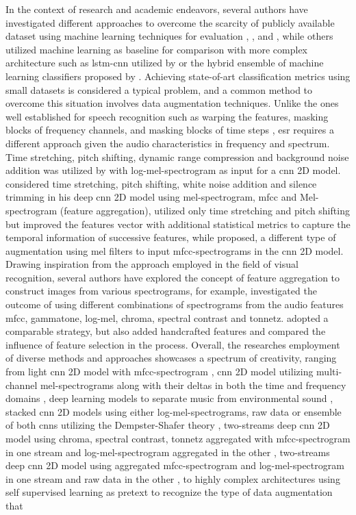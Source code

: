 In the context of research and academic endeavors, several authors have investigated different approaches to overcome the scarcity of publicly available dataset using machine learning techniques for evaluation  \cite{Salamon2014}, \cite{Bountourakis2015}, and \cite{Piczak2015}, while others utilized machine learning as baseline for comparison with more complex architecture such as \gls{lstm}-\gls{cnn} utilized by \textcite{Pandya2021} or the hybrid ensemble of machine learning classifiers proposed by \textcite{Bansal2022}. Achieving state-of-art classification metrics using small datasets is considered a typical problem, and a common method to overcome this situation involves data augmentation techniques. Unlike the ones well established for speech recognition such as warping the features, masking blocks of frequency channels, and masking blocks of time steps \cite{Park2019}, \gls{esr} requires a different approach given the audio characteristics in frequency and spectrum. Time stretching, pitch shifting, dynamic range compression and background noise addition was utilized by \textcite{Salamon2017} with log-mel-spectrogram as input for a \gls{cnn} 2D model. \textcite{Mushtaq2020} considered time stretching, pitch shifting, white noise addition and silence trimming in his deep \gls{cnn} 2D model using mel-spectrogram, \gls{mfcc} and Mel-spectrogram (feature aggregation), \textcite{Bountourakis2019} utilized only time stretching and pitch shifting but improved the features vector with additional statistical metrics to capture the temporal information of successive features, while \textcite{Chu2023} proposed, a different type of augmentation using mel filters to input \gls{mfcc}-spectrograms in the \gls{cnn} 2D model. Drawing inspiration from the approach employed in the field of visual recognition, several authors have explored the concept of feature aggregation to construct images from various spectrograms, for example, \textcite{Su2020} investigated the outcome of using different combinations of spectrograms from the audio features \gls{mfcc}, gammatone, log-mel, chroma, spectral contrast and tonnetz. \textcite{Luz2021} adopted a comparable strategy, but also added handcrafted features and compared the influence of feature selection in the process. Overall, the researches employment of diverse methods and approaches showcases a spectrum of creativity, ranging from light \gls{cnn} 2D model with \gls{mfcc}-spectrogram \cite{Shreyas2020}, \gls{cnn} 2D model utilizing multi-channel mel-spectrograms along with their deltas in both the time and frequency domains \cite{Tang2018}, deep learning models to separate music from environmental sound \cite{Rothmund2018}, stacked \gls{cnn} 2D models using either log-mel-spectrograms, raw data or ensemble of both \gls{cnn}s utilizing the Dempster-Shafer theory \cite{Li2018}, two-streams deep \gls{cnn} 2D model using chroma, spectral contrast, tonnetz aggregated with \gls{mfcc}-spectrogram in one stream and log-mel-spectrogram aggregated in the other \cite{Su2019}, two-streams deep \gls{cnn} 2D model using aggregated \gls{mfcc}-spectrogram and log-mel-spectrogram in one stream and raw data in the other \cite{Tran2020}, to highly complex architectures using self supervised learning as pretext to recognize the type of data augmentation that 